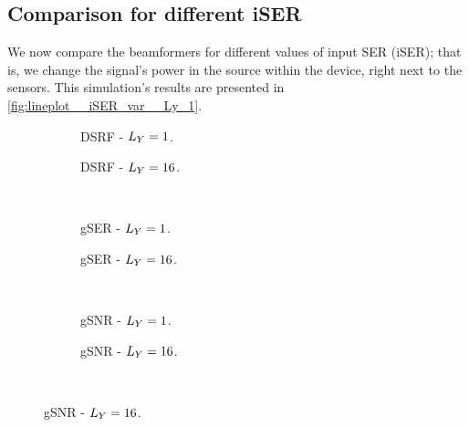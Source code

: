 
\subsection{Comparison for different iSER}

We now compare the beamformers for different values of input SER (iSER); that is, we change the signal's power in the source within the device, right next to the sensors. This simulation's results are presented in \cref{fig:lineplot__iSER_var__Ly_1}.
\begin{figure}[!ht]
	\centering
	\begin{subfigure}{0.49\textwidth}
		\centering
		
		\caption{DSRF - $\Ly = 1$.}
		\label{subfig:lineplot__DSRF__iSER_var__Ly_1}
	\end{subfigure}\hfill
	\begin{subfigure}{0.49\textwidth}
		\centering
		
		\caption{DSRF - $\Ly = 16$.}
		\label{subfig:lineplot__DSRF__iSER_var__Ly_16}
	\end{subfigure}\\[1em]
	\begin{subfigure}{0.49\textwidth}
		\centering
		
		\caption{gSER - $\Ly = 1$.}
		\label{subfig:lineplot__gSER__iSER_var__Ly_1}
	\end{subfigure}\hfill
	\begin{subfigure}{0.49\textwidth}
		\centering
		
		\caption{gSER - $\Ly = 16$.}
		\label{subfig:lineplot__gSER__iSER_var__Ly_16}
	\end{subfigure}\\[1em]
	\begin{subfigure}{0.49\textwidth}
		\centering
		
		\caption{gSNR - $\Ly = 1$.}
		\label{subfig:lineplot__gSNR__iSER_var__Ly_1}
	\end{subfigure}\hfill
	\begin{subfigure}{0.49\textwidth}
		\centering
		
		\caption{gSNR - $\Ly = 16$.}
		\label{subfig:lineplot__gSNR__iSER_var__Ly_16}
	\end{subfigure}\\[1em]

\end{figure}
